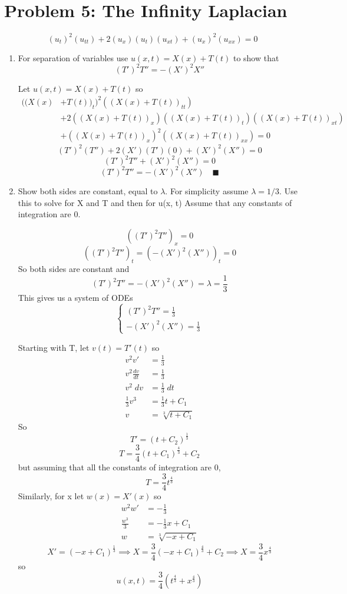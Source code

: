 \documentclass[12pt]{article}
\begin{document}
\section*{Problem 5: The Infinity Laplacian}
\[(u_t)^2 (u_{tt}) + 2(u_x)(u_{t})(u_{xt}) + (u_x)^2(u_{xx}) = 0\]
\begin{enumerate}
    \item For separation of variables use $u(x, t) = X(x) + T(t)$ to show that 
    \[(T')^2T'' = -(X')^2 X''\]

    \color{blue}
    Let $u(x, t) = X(x) + T(t)$ so 
    \begin{align*}
        ((X(x) &+ T(t))_t)^2 ((X(x) + T(t))_{tt})\\ 
        &+ 2((X(x) + T(t))_x)((X(x) + T(t))_{t})((X(x) + T(t))_{xt}) \\
        &+ ((X(x) + T(t))_x)^2((X(x) + T(t))_{xx}) = 0
    \end{align*}
    \[(T')^2(T'') + 2(X')(T')(0)+ (X')^2(X'') = 0\]
    \[(T')^2T'' + (X')^2(X'') = 0\]
    \[(T')^2T'' = -(X')^2(X'') \quad \blacksquare\]
    \color{black}
    \item Show both sides are constant, equal to $\lambda$. For simplicity assume $\lambda = 1/3$. Use this to solve for X and T and then for u(x, t) Assume that any constants of integration are 0.
    
    \color{blue}
    \[((T')^2T'')_x = 0\]
    \[((T')^2T'')_t = (-(X')^2(X''))_t = 0\] 
    So both sides are constant and 
    \[(T')^2T'' = -(X')^2(X'') = \lambda = \frac{1}{3}\]
    This gives us a system of ODEs
    \[\begin{cases}
        (T')^2T'' = \frac{1}{3}\\
        -(X')^2(X'') = \frac{1}{3}
    \end{cases}\]

    Starting with T, let $v(t) = T'(t)$ so 
    \begin{align*}
        v^2v' &= \frac{1}{3}\\
        v^2 \frac{dv}{dt} &= \frac{1}{3}\\
        v^2 \; dv &= \frac{1}{3} \; dt\\
        \frac{1}{3}v^3&= \frac{1}{3}t + C_1\\
        v &= \sqrt[3]{t + C_1}
    \end{align*}
    So 
    \[T' = (t + C_2)^\frac{1}{3}\]
    \[T = \frac{3}{4}(t + C_1)^{\frac{4}{3}} + C_2\]
    but assuming that all the constants of integration are 0,
    \[T = \frac{3}{4}t^{\frac{4}{3}}\]
    Similarly, for x let $w(x) = X'(x)$ so 
    \begin{align*}
        w^2 w' &= -\frac{1}{3}\\
        \frac{w^3}{3} &= -\frac{1}{3}x + C_1\\
        w &= \sqrt[3]{-x + C_1}
    \end{align*}
    \[X' = (-x + C_1)^{\frac{1}{3}} \implies X = \frac{3}{4}(-x + C_1)^{\frac{4}{3}}+ C_2 \implies X = \frac{3}{4}x^{\frac{4}{3}}\]
    so 
    \[\boxed{u(x, t) = \frac{3}{4}(t^\frac{4}{3} + x^\frac{4}{3})}\]
\end{enumerate}
\end{document}
